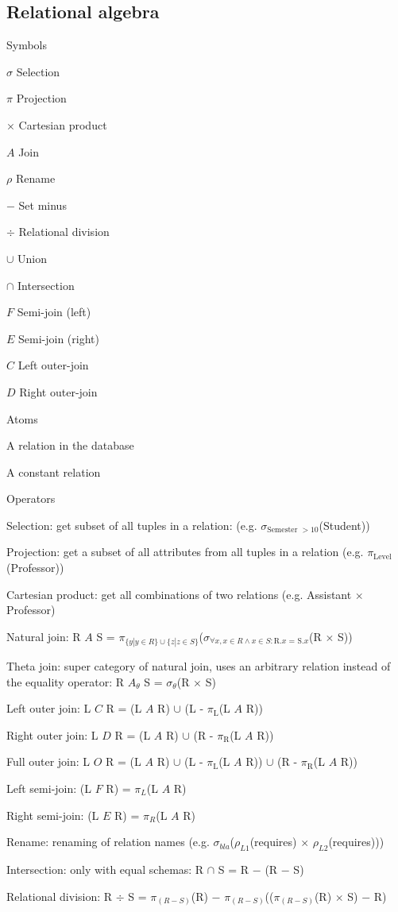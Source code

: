 \subsection{Relational algebra}
\enumstart
	\item Symbols
	\enumstart
		\item $\sigma$ Selection
		\item $\pi$ Projection
		\item $\times$ Cartesian product
		\item $A$ Join
		\item $\rho$ Rename
		\item $-$ Set minus
		\item $\div$ Relational division
		\item $\cup$ Union
		\item $\cap$ Intersection
		\item $F$ Semi-join (left)
		\item $E$ Semi-join (right)
		\item $C$ Left outer-join
		\item $D$ Right outer-join
	\enumend
	\item Atoms
	\enumstart
		\item A relation in the database
		\item A constant relation
	\enumend
	\item Operators
	\enumstart
		\item Selection: get subset of all tuples in a relation: (e.g. $\sigma_{\text{Semester }> 10}$(Student))
		\item Projection: get a subset of all attributes from all tuples in a relation (e.g. $\pi_{\text{Level}}$(Professor))
		\item Cartesian product: get all combinations of two relations (e.g. Assistant $\times$ Professor)
		\item Natural join: R $A$ S = $\pi_{\{y|y \in R\}\cup\{z|z \in S\}}$($\sigma_{\forall x,x \in R \land x \in S: \text{R.$x$ = S.$x$}}$(R $\times$ S))
		\item Theta join: super category of natural join, uses an arbitrary relation instead of the equality operator: R $A_\theta$ S = $\sigma_{\theta}$(R $\times$ S)
		\item Left outer join: L $C$ R = (L $A$ R) $\cup$ (L - $\pi_{\text{L}}$(L $A$ R))
		\item Right outer join: L $D$ R = (L $A$ R) $\cup$ (R - $\pi_{\text{R}}$(L $A$ R))
		\item Full outer join:  L $O$ R = (L $A$ R) $\cup$ (L - $\pi_{\text{L}}$(L $A$ R)) $\cup$ (R - $\pi_{\text{R}}$(L $A$ R))
		\item Left semi-join: (L $F$ R) = $\pi_{L}$(L $A$ R)
		\item Right semi-join: (L $E$ R) = $\pi_{R}$(L $A$ R)
		\item Rename: renaming of relation names (e.g. $\sigma_{bla}$($\rho_{L1}$(requires) $\times$ $\rho_{L2}$(requires)))
		\item Intersection: only with equal schemas: R $\cap$ S = R $-$ (R $-$ S)
		\item Relational division: R $\div$ S = $\pi_{(R-S)}$(R) $-$ $\pi_{(R-S)}$(($\pi_{(R-S)}$(R) $\times$ S) $-$ R) 
	\enumend
\enumend

